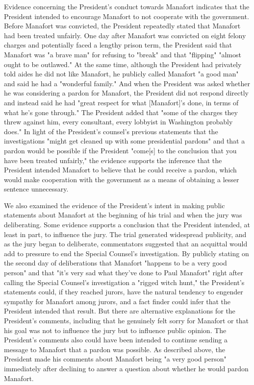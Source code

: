 Evidence concerning the President's conduct towards Manafort indicates that the President intended to encourage Manafort to not cooperate with the government.
Before Manafort was convicted, the President repeatedly stated that Manafort had been treated unfairly.
One day after Manafort was convicted on eight felony charges and potentially faced a lengthy prison term, the President said that Manafort was "a brave man" for refusing to "break" and that "flipping" "almost ought to be outlawed."
At the same time, although the President had privately told aides he did not like Manafort, he publicly called Manafort "a good man" and said he had a "wonderful family."
And when the President was asked whether he was considering a pardon for Manafort, the President did not respond directly and instead said he had "great respect for what [Manafort]'s done, in terms of what he's gone through."
The President added that "some of the charges they threw against him, every consultant, every lobbyist in Washington probably does."
In light of the President's counsel's previous statements that the investigations "might get cleaned up with some presidential pardons" and that a pardon would be possible if the President "come[s] to the conclusion that you have been treated unfairly," the evidence supports the inference that the President intended Manafort to believe that he could receive a pardon, which would make cooperation with the government as a means of obtaining a lesser sentence unnecessary.

We also examined the evidence of the President's intent in making public statements about Manafort at the beginning of his trial and when the jury was deliberating.
Some evidence supports a conclusion that the President intended, at least in part, to influence the jury.
The trial generated widespread publicity, and as the jury began to deliberate, commentators suggested that an acquittal would add to pressure to end the Special Counsel's investigation.
By publicly stating on the second day of deliberations that Manafort "happens to be a very good person" and that "it's very sad what they've done to Paul Manafort" right after calling the Special Counsel's investigation a "rigged witch hunt," the President's statements could, if they reached jurors, have the natural tendency to engender sympathy for Manafort among jurors, and a fact finder could infer that the President intended that result.
But there are alternative explanations for the President's comments, including that he genuinely felt sorry for Manafort or that his goal was not to influence the jury but to influence public opinion.
The President's comments also could have been intended to continue sending a message to Manafort that a pardon was possible.
As described above, the President made his comments about Manafort being "a very good person" immediately after declining to answer a question about whether he would pardon Manafort.

